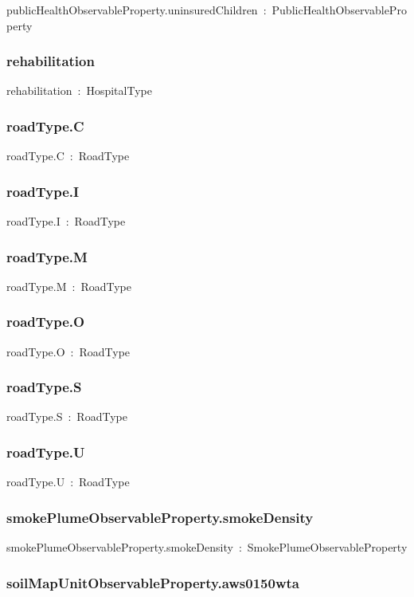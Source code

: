 \documentclass{article}
\begin{document}
publicHealthObservableProperty.uninsuredChildren~:~PublicHealthObservableProperty

\subsubsection*{rehabilitation}

rehabilitation~:~HospitalType

\subsubsection*{roadType.C}

roadType.C~:~RoadType

\subsubsection*{roadType.I}

roadType.I~:~RoadType

\subsubsection*{roadType.M}

roadType.M~:~RoadType

\subsubsection*{roadType.O}

roadType.O~:~RoadType

\subsubsection*{roadType.S}

roadType.S~:~RoadType

\subsubsection*{roadType.U}

roadType.U~:~RoadType

\subsubsection*{smokePlumeObservableProperty.smokeDensity}

smokePlumeObservableProperty.smokeDensity~:~SmokePlumeObservableProperty

\subsubsection*{soilMapUnitObservableProperty.aws0150wta}
\end{document}
